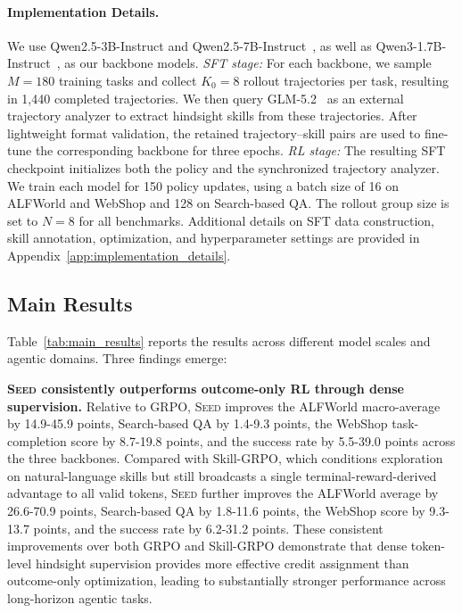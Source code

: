 \paragraph{Implementation Details.}
We use Qwen2.5-3B-Instruct and Qwen2.5-7B-Instruct~\citep{yang2024qwen25}, as well as Qwen3-1.7B-Instruct~\citep{yang2025qwen3}, as our backbone models.
\textit{SFT stage:}
For each backbone, we sample $M=180$ training tasks and collect $K_0=8$ rollout trajectories per task, resulting in 1,440 completed trajectories.
We then query GLM-5.2~\citep{zai2026glm52} as an external trajectory analyzer to extract hindsight skills from these trajectories.
After lightweight format validation, the retained trajectory--skill pairs are used to fine-tune the corresponding backbone for three epochs.
\textit{RL stage:}
The resulting SFT checkpoint initializes both the policy and the synchronized trajectory analyzer.
We train each model for 150 policy updates, using a batch size of 16 on ALFWorld and WebShop and 128 on Search-based QA.
The rollout group size is set to $N=8$ for all benchmarks.
Additional details on SFT data construction, skill annotation, optimization, and hyperparameter settings are provided in Appendix~\ref{app:implementation_details}.

\subsection{Main Results}\label{subsec32_main_results}
Table~\ref{tab:main_results} reports the results across different model scales and agentic domains. Three findings emerge:

\textbf{\textsc{Seed} consistently outperforms outcome-only RL through dense supervision.} Relative to GRPO, \textsc{Seed} improves the ALFWorld macro-average by 14.9-45.9 points, Search-based QA by 1.4-9.3 points, the WebShop task-completion score by 8.7-19.8 points, and the success rate by 5.5-39.0 points across the three backbones. Compared with Skill-GRPO, which conditions exploration on natural-language skills but still broadcasts a single terminal-reward-derived advantage to all valid tokens, \textsc{Seed} further improves the ALFWorld average by 26.6-70.9 points, Search-based QA by 1.8-11.6 points, the WebShop score by 9.3-13.7 points, and the success rate by 6.2-31.2 points. These consistent improvements over both GRPO and Skill-GRPO demonstrate that dense token-level hindsight supervision provides more effective credit assignment than outcome-only optimization, leading to substantially stronger performance across long-horizon agentic tasks.

